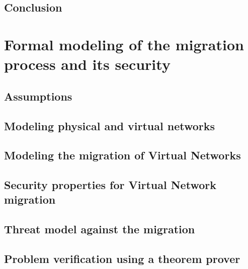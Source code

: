 \documentclass[a4paper, 11pt]{report}
\theoremstyle{definition}
\begin{document}
% 



\section{Conclusion}


\newpage
\chapter{Formal modeling of the migration process and its security}
\label{sec:formal_model}


% 

\section{Assumptions}


\section{Modeling physical and virtual networks}


\newpage
\section{Modeling the migration of Virtual Networks}


\newpage
\section{Security properties for Virtual Network migration}



\newpage
\section{Threat model against the migration}


\section{Problem verification using a theorem prover}

\end{document}
